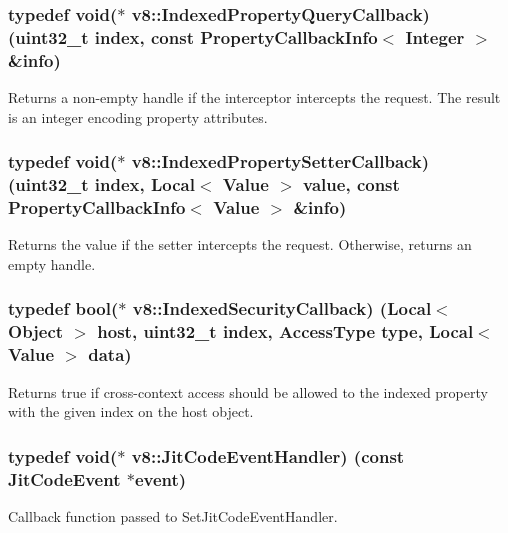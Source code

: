 \subsubsection[{Indexed\+Property\+Query\+Callback}]{\setlength{\rightskip}{0pt plus 5cm}typedef void($\ast$ v8\+::\+Indexed\+Property\+Query\+Callback) (uint32\+\_\+t index, const {\bf Property\+Callback\+Info}$<$ {\bf Integer} $>$ \&info)}\label{namespacev8_a980b62c33eb664783e61e25c3b27f9ee}
Returns a non-\/empty handle if the interceptor intercepts the request. The result is an integer encoding property attributes. \hypertarget{namespacev8_a4ac7cc6185ebc8b6a199f9fa8e6bf5c3}{}
\subsubsection[{Indexed\+Property\+Setter\+Callback}]{\setlength{\rightskip}{0pt plus 5cm}typedef void($\ast$ v8\+::\+Indexed\+Property\+Setter\+Callback) (uint32\+\_\+t index, {\bf Local}$<$ {\bf Value} $>$ value, const {\bf Property\+Callback\+Info}$<$ {\bf Value} $>$ \&info)}\label{namespacev8_a4ac7cc6185ebc8b6a199f9fa8e6bf5c3}
Returns the value if the setter intercepts the request. Otherwise, returns an empty handle. \hypertarget{namespacev8_aebbcc7837753e51112d944ad96520da1}{}
\subsubsection[{Indexed\+Security\+Callback}]{\setlength{\rightskip}{0pt plus 5cm}typedef bool($\ast$ v8\+::\+Indexed\+Security\+Callback) ({\bf Local}$<$ {\bf Object} $>$ host, uint32\+\_\+t index, {\bf Access\+Type} type, {\bf Local}$<$ {\bf Value} $>$ data)}\label{namespacev8_aebbcc7837753e51112d944ad96520da1}
Returns true if cross-\/context access should be allowed to the indexed property with the given index on the host object. \hypertarget{namespacev8_a39243bc91e63d64d111452fdb98c4733}{}
\subsubsection[{Jit\+Code\+Event\+Handler}]{\setlength{\rightskip}{0pt plus 5cm}typedef void($\ast$ v8\+::\+Jit\+Code\+Event\+Handler) (const {\bf Jit\+Code\+Event} $\ast$event)}\label{namespacev8_a39243bc91e63d64d111452fdb98c4733}
Callback function passed to Set\+Jit\+Code\+Event\+Handler.


